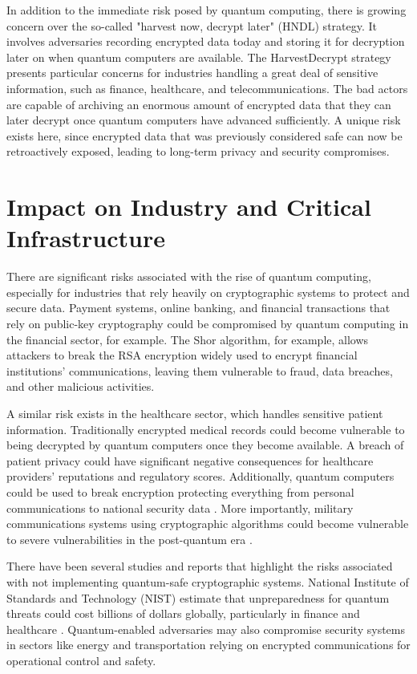 \documentclass[conference]{IEEEtran}
\begin{document}
In addition to the immediate risk posed by quantum computing, there is growing concern over the so-called "harvest now, decrypt later" (HNDL) strategy. It involves adversaries recording encrypted data today and storing it for decryption later on when quantum computers are available. The HarvestDecrypt strategy presents particular concerns for industries handling a great deal of sensitive information, such as finance, healthcare, and telecommunications. The bad actors are capable of archiving an enormous amount of encrypted data that they can later decrypt once quantum computers have advanced sufficiently. A unique risk exists here, since encrypted data that was previously considered safe can now be retroactively exposed, leading to long-term privacy and security compromises\cite{HarvestDecrypt}.

\section{Impact on Industry and Critical Infrastructure}

There are significant risks associated with the rise of quantum computing, especially for industries that rely heavily on cryptographic systems to protect and secure data. Payment systems, online banking, and financial transactions that rely on public-key cryptography could be compromised by quantum computing in the financial sector, for example. The Shor algorithm, for example, allows attackers to break the RSA encryption widely used to encrypt financial institutions' communications, leaving them vulnerable to fraud, data breaches, and other malicious activities\cite{FinancialImpact}.

A similar risk exists in the healthcare sector, which handles sensitive patient information. Traditionally encrypted medical records could become vulnerable to being decrypted by quantum computers once they become available. A breach of patient privacy could have significant negative consequences for healthcare providers' reputations and regulatory scores. Additionally, quantum computers could be used to break encryption protecting everything from personal communications to national security data \cite{TelecomThreat}. More importantly, military communications systems using cryptographic algorithms could become vulnerable to severe vulnerabilities in the post-quantum era \cite{DefenseImpact}.

There have been several studies and reports that highlight the risks associated with not implementing quantum-safe cryptographic systems. National Institute of Standards and Technology (NIST) estimate that unpreparedness for quantum threats could cost billions of dollars globally, particularly in finance and healthcare \cite{NISTReport}. Quantum-enabled adversaries may also compromise security systems in sectors like energy and transportation relying on encrypted communications for operational control and safety.
\end{document}
